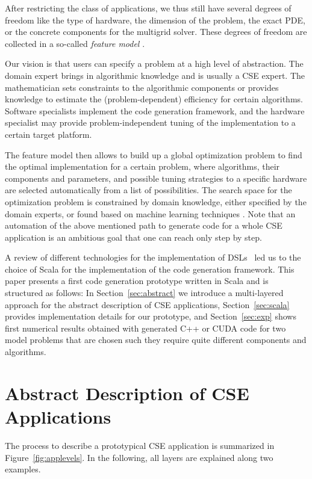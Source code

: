\documentclass[onecolumn]{svjour3}
\begin{document}
After restricting the class of applications, we thus still have several degrees of freedom like the type of hardware, the dimension of the problem, the exact PDE, or the concrete components for the multigrid solver. These degrees of freedom are collected in a so-called \textit{feature model} \cite{batory2005featuremodels}.

Our vision is that users can specify a problem at a high level of abstraction. 
The domain expert brings in algorithmic knowledge and is usually a CSE expert.
The mathematician sets constraints to the algorithmic components or provides knowledge to estimate the (problem-dependent) efficiency for certain algorithms.
Software specialists implement the code generation framework,
and the hardware specialist may provide problem-independent tuning of the implementation to a certain target platform.

The feature model then allows to build up a global optimization problem to find the optimal implementation for a certain problem, where algorithms, their components and parameters, and possible tuning strategies to a specific hardware are selected automatically from a list of possibilities. The search space for the optimization problem is constrained by domain knowledge, either specified by the domain experts, or found based on machine learning techniques \cite{siegmund2012predicting}.
Note that an automation of the above mentioned path to generate code for a whole CSE application is an ambitious goal that one can reach only step by step.

A review of different technologies for the implementation of \acp{DSL}~\cite{SKKHT14} led us to the choice of Scala for the implementation of the code generation framework. This paper presents a first code generation prototype written in Scala and is structured as follows: In Section~\ref{sec:abstract} we introduce a multi-layered approach for the abstract description of CSE applications, Section~\ref{sec:scala} provides implementation details for our prototype, and Section~\ref{sec:exp} shows first numerical results obtained with generated C++ or CUDA code for two model problems that are chosen such they require quite different components and algorithms. 


\section{Abstract Description of CSE Applications\label{sec:abstract}}

The process to describe a prototypical CSE application is summarized in Figure~\ref{fig:applevels}. In the following, all layers are explained along two examples.  
\end{document}
